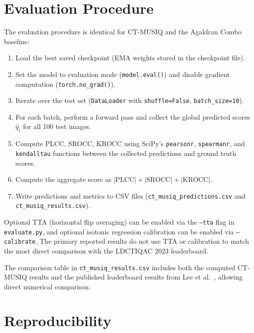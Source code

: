 \section{Evaluation Procedure}
\label{sec:exp_eval}

The evaluation procedure is identical for CT-MUSIQ and the Agaldran Combo baseline:

\begin{enumerate}
    \item Load the best saved checkpoint (EMA weights stored in the checkpoint file).
    \item Set the model to evaluation mode (\texttt{model.eval()}) and disable gradient
          computation (\texttt{torch.no\_grad()}).
    \item Iterate over the test set (\texttt{DataLoader} with \texttt{shuffle=False},
          \texttt{batch\_size=10}).
    \item For each batch, perform a forward pass and collect the global predicted scores
          $\hat{q}_i$ for all 100 test images.
    \item Compute PLCC, SROCC, KROCC using SciPy's \texttt{pearsonr}, \texttt{spearmanr},
          and \texttt{kendalltau} functions between the collected predictions and ground
          truth scores.
    \item Compute the aggregate score as $|\text{PLCC}| + |\text{SROCC}| + |\text{KROCC}|$.
    \item Write predictions and metrics to CSV files
          (\texttt{ct\_musiq\_predictions.csv} and \texttt{ct\_musiq\_results.csv}).
\end{enumerate}

Optional TTA (horizontal flip averaging) can be enabled via the \texttt{--tta} flag
in \texttt{evaluate.py}, and optional isotonic regression calibration can be enabled
via \texttt{--calibrate}. The primary reported results do not use TTA or calibration
to match the most direct comparison with the LDCTIQAC 2023 leaderboard.

The comparison table in \texttt{ct\_musiq\_results.csv} includes both the computed
CT-MUSIQ results and the published leaderboard results from Lee et al.\
\cite{lee2025ldctiqac}, allowing direct numerical comparison.


\section{Reproducibility}
\label{sec:exp_repro}

